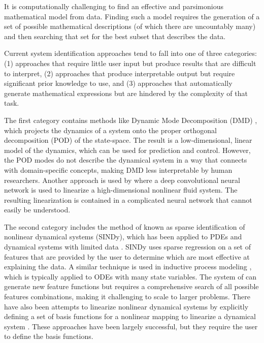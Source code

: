 \documentclass{article}
\begin{document}
It is computationally challenging to find an effective and parsimonious mathematical model from data. Finding such a model requires the generation of a set of possible mathematical descriptions (of which there are uncountably many) and then searching that set for the best subset that describes the data.
 
Current system identification approaches tend to fall into one of three categories: (1) approaches that require little user input but produce results that are difficult to interpret, (2) approaches that produce interpretable output but require significant prior knowledge to use, and (3) approaches that automatically generate mathematical expressions but are hindered by the complexity of that task.

The first category contains methods like Dynamic Mode Decomposition (DMD) \cite{schmid2010dynamic, kutz2016dynamic}, which projects the dynamics of a system onto the proper orthogonal decomposition (POD) of the state-space. The result is a low-dimensional, linear model of the dynamics, which can be used for prediction and control. However, the POD modes do not describe the dynamical system in a way that connects with domain-specific concepts, making DMD less interpretable by human researchers. Another approach is used by \citet{morton2018deep} where a deep convolutional neural network is used to linearize a high-dimensional nonlinear fluid system. The resulting linearization is contained in a complicated neural network that cannot easily be understood.

The second category includes the method of \citet{brunton2016discovering} known as sparse identification of nonlinear dynamical systems (SINDy), which has been applied to PDEs \cite{rudy2017data} and dynamical systems with limited data \cite{kaiser2018sparse}. SINDy uses sparse regression on a set of features that are provided by the user to determine which are most effective at explaining the data. A similar technique is used in inductive process modeling \cite{bridewell2008inductive, langley2015heuristic}, which is typically applied to ODEs with many state variables. The system of \citet{krizman1995discovering} can generate new feature functions but requires a comprehensive search of all possible features combinations, making it challenging to scale to larger problems. There have also been attempts to linearize nonlinear dynamical systems by explicitly defining a set of basis functions for a nonlinear mapping to linearize a dynamical system \cite{williams2015data, johnson2018class}. These approaches have been largely successful, but they require the user to define the basis functions. 
\end{document}
